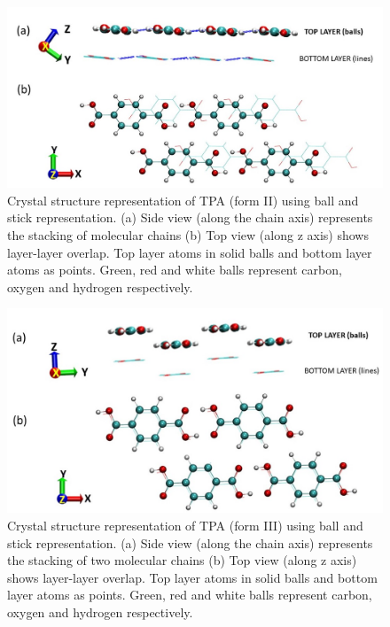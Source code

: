 \begin{figure}
    \centering
    \includegraphics[width=15cm ]{./Appendix4/new_figures_si/figure1.jpg}
    \caption{Crystal structure representation of TPA (form II) using ball and stick representation. (a) Side view (along the chain axis) represents the stacking of molecular chains (b) Top view (along z axis) shows layer-layer overlap. Top layer atoms in solid balls and bottom layer atoms as points. Green, red and white balls represent carbon, oxygen and hydrogen respectively.}
    \label{fig:cip1}
\end{figure}

\begin{figure}
    \centering
    \includegraphics[width=15cm ]{./Appendix4/new_figures_si/figure2.jpg}
    \caption{Crystal structure representation of TPA (form III) using ball and stick representation. (a) Side view (along the chain axis) represents the stacking of two molecular chains (b) Top view (along z axis) shows layer-layer overlap. Top layer atoms in solid balls and bottom layer atoms as points. Green, red and white balls represent carbon, oxygen and hydrogen respectively.}
    \label{fig:cip2}
\end{figure}

